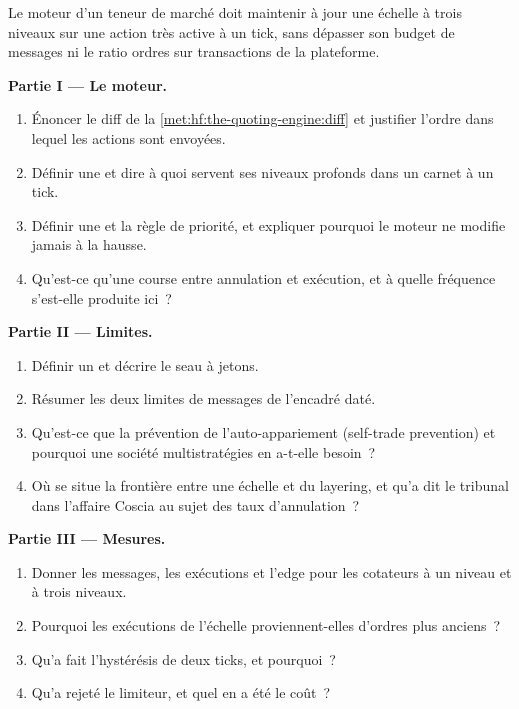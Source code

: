 \begin{problem}\label{pb:hf:the-quoting-engine:1}
Le moteur d'un teneur de marché doit maintenir à jour une échelle à trois niveaux sur une action très active à un tick, sans dépasser son budget de messages ni le
ratio ordres sur transactions de la plateforme.

\medskip\noindent\textbf{Partie I --- Le moteur.}
\begin{enumerate}
\item Énoncer le diff de la \cref{met:hf:the-quoting-engine:diff} et justifier l'ordre dans lequel les actions sont envoyées.
\item Définir une  et dire à quoi servent ses niveaux profonds dans un carnet à un tick.
\item Définir une  et la règle de priorité, et expliquer pourquoi le moteur ne modifie jamais à la hausse.
\item Qu'est-ce qu'une course entre annulation et exécution, et à quelle fréquence s'est-elle produite ici~?
\end{enumerate}

\medskip\noindent\textbf{Partie II --- Limites.}
\begin{enumerate}[resume]
\item Définir un  et décrire le seau à jetons.
\item Résumer les deux limites de messages de l'encadré daté.
\item Qu'est-ce que la prévention de l'auto-appariement (self-trade prevention) et pourquoi une société multistratégies en a-t-elle besoin~?
\item Où se situe la frontière entre une échelle et du layering, et qu'a dit le tribunal dans l'affaire Coscia au sujet des taux d'annulation~?
\end{enumerate}

\medskip\noindent\textbf{Partie III --- Mesures.}
\begin{enumerate}[resume]
\item Donner les messages, les exécutions et l'edge pour les cotateurs à un niveau et à trois niveaux.
\item Pourquoi les exécutions de l'échelle proviennent-elles d'ordres plus anciens~?
\item Qu'a fait l'hystérésis de deux ticks, et pourquoi~?
\item Qu'a rejeté le limiteur, et quel en a été le coût~?
\end{enumerate}


\end{problem}
